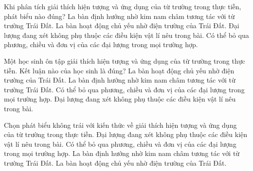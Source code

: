 \begin{ex}
Khi phân tích giải thích hiện tượng và ứng dụng của từ trường trong thực tiễn, phát biểu nào đúng?
\choice
{\True La bàn định hướng nhờ kim nam châm tương tác với từ trường Trái Đất.}
{La bàn hoạt động chủ yếu nhờ điện trường của Trái Đất.}
{Đại lượng đang xét không phụ thuộc các điều kiện vật lí nêu trong bài.}
{Có thể bỏ qua phương, chiều và đơn vị của các đại lượng trong mọi trường hợp.}
\end{ex}

\begin{ex}
Một học sinh ôn tập giải thích hiện tượng và ứng dụng của từ trường trong thực tiễn. Kết luận nào của học sinh là đúng?
\choice
{La bàn hoạt động chủ yếu nhờ điện trường của Trái Đất.}
{\True La bàn định hướng nhờ kim nam châm tương tác với từ trường Trái Đất.}
{Có thể bỏ qua phương, chiều và đơn vị của các đại lượng trong mọi trường hợp.}
{Đại lượng đang xét không phụ thuộc các điều kiện vật lí nêu trong bài.}
\end{ex}

\begin{ex}
Chọn phát biểu không trái với kiến thức về giải thích hiện tượng và ứng dụng của từ trường trong thực tiễn.
\choice
{Đại lượng đang xét không phụ thuộc các điều kiện vật lí nêu trong bài.}
{Có thể bỏ qua phương, chiều và đơn vị của các đại lượng trong mọi trường hợp.}
{\True La bàn định hướng nhờ kim nam châm tương tác với từ trường Trái Đất.}
{La bàn hoạt động chủ yếu nhờ điện trường của Trái Đất.}
\end{ex}

